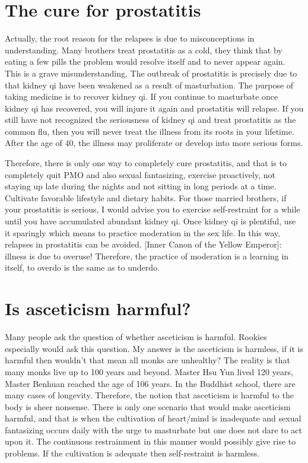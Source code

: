\documentclass[
]{book}
\begin{document}
\hypertarget{the-cure-for-prostatitis}{%
\section{The cure for prostatitis}\label{the-cure-for-prostatitis}}

Actually, the root reason for the relapses is due to misconceptions in understanding. Many brothers treat prostatitis as a cold, they think that by eating a few pills the problem would resolve itself and to never appear again. This is a grave misunderstanding. The outbreak of prostatitis is precisely due to that kidney qi have been weakened as a result of masturbation. The purpose of taking medicine is to recover kidney qi. If you continue to masturbate once kidney qi has recovered, you will injure it again and prostatitis will relapse. If you still have not recognized the seriousness of kidney qi and treat prostatitis as the common flu, then you will never treat the illness from its roots in your lifetime. After the age of 40, the illness may proliferate or develop into more serious forms.

Therefore, there is only one way to completely cure prostatitis, and that is to completely quit PMO and also sexual fantasizing, exercise proactively, not staying up late during the nights and not sitting in long periods at a time. Cultivate favorable lifestyle and dietary habits. For those married brothers, if your prostatitis is serious, I would advise you to exercise self-restraint for a while until you have accumulated abundant kidney qi. Once kidney qi is plentiful, use it sparingly which means to practice moderation in the sex life. In this way, relapses in prostatitis can be avoided. {[}Inner Canon of the Yellow Emperor{]}: illness is due to overuse! Therefore, the practice of moderation is a learning in itself, to overdo is the same as to underdo.

\hypertarget{is-asceticism-harmful}{%
\section{Is asceticism harmful?}\label{is-asceticism-harmful}}

Many people ask the question of whether asceticism is harmful. Rookies especially would ask this question. My answer is the asceticism is harmless, if it is harmful then wouldn't that mean all monks are unhealthy? The reality is that many monks live up to 100 years and beyond. Master Hsu Yun lived 120 years, Master Benhuan reached the age of 106 years. In the Buddhist school, there are many cases of longevity. Therefore, the notion that asceticism is harmful to the body is sheer nonsense. There is only one scenario that would make asceticism harmful, and that is when the cultivation of heart/mind is inadequate and sexual fantasizing occurs daily with the urge to masturbate but one does not dare to act upon it. The continuous restrainment in this manner would possibly give rise to problems. If the cultivation is adequate then self-restraint is harmless.
\end{document}

